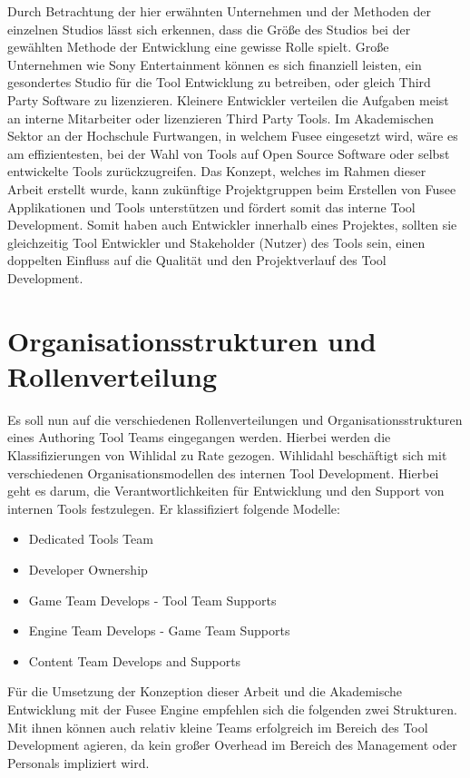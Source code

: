 \documentclass[pagesize, paper=a4, fontsize=12pt, titlepage=true, headings=small, headnosepline, abstractoff, liststotoc, nochapterprefix, plainheadsepline, twoside]{scrreprt}
\begin{document}
Durch Betrachtung der hier erwähnten Unternehmen und der Methoden der einzelnen Studios lässt sich erkennen, dass die Größe des Studios bei der gewählten Methode der Entwicklung eine gewisse Rolle spielt. Große Unternehmen wie Sony Entertainment können es sich finanziell leisten, ein gesondertes Studio für die Tool Entwicklung zu betreiben, oder gleich Third Party Software zu lizenzieren. Kleinere Entwickler verteilen die Aufgaben meist an interne Mitarbeiter oder lizenzieren Third Party Tools. Im Akademischen Sektor an der Hochschule Furtwangen, in welchem Fusee eingesetzt wird, wäre es am effizientesten, bei der Wahl von Tools auf Open Source Software oder selbst entwickelte Tools zurückzugreifen. Das Konzept, welches im Rahmen dieser Arbeit erstellt wurde, kann zukünftige Projektgruppen beim Erstellen von Fusee Applikationen und Tools unterstützen und fördert somit das interne Tool Development. Somit haben auch Entwickler innerhalb eines Projektes, sollten sie gleichzeitig Tool Entwickler und Stakeholder (Nutzer) des Tools sein, einen doppelten Einfluss auf die Qualität und den Projektverlauf des Tool Development.

\section{Organisationsstrukturen und Rollenverteilung}
Es soll nun auf die verschiedenen Rollenverteilungen und Organisationsstrukturen eines Authoring Tool Teams eingegangen werden. Hierbei werden die Klassifizierungen von Wihlidal zu Rate gezogen.
Wihlidahl \autocite[S. 5]{Wihlidal2006} beschäftigt sich mit verschiedenen Organisationsmodellen des internen Tool Development. Hierbei geht es darum, die Verantwortlichkeiten für Entwicklung und den Support von internen Tools festzulegen. Er klassifiziert folgende Modelle:
\begin{itemize}
\item Dedicated Tools Team
\item Developer Ownership
\item Game Team Develops - Tool Team Supports
\item Engine Team Develops - Game Team Supports
\item Content Team Develops and Supports
\end{itemize}

Für die Umsetzung der Konzeption dieser Arbeit und die Akademische Entwicklung mit der Fusee Engine empfehlen sich die folgenden zwei Strukturen. Mit ihnen können auch relativ kleine Teams erfolgreich im Bereich des Tool Development agieren, da kein großer Overhead im Bereich des Management oder Personals impliziert wird.
\end{document}
